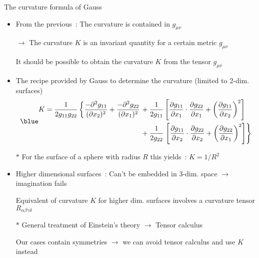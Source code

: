 \Tr
\begin{center}
{\blue The curvature formula of Gauss}
\end{center}
%
\begin{itemize}
\item From the previous~: {\red The curvature is contained in $g_{\mu\nu}$}
\item[] $\rightarrow$ The {\blue curvature $K$} is an invariant quantity for a certain metric $g_{\mu\nu}$
\item[] It should be possible to obtain the curvature $K$ from the tensor $g_{\mu\nu}$
\item The recipe provided by Gauss to determine the curvature (limited to 2-dim. surfaces)
      \begin{equation*}
      {\blue
      \begin{split}
       K=\frac{1}{2g_{11}g_{22}} \left\{
       \frac{-\partial^{2}g_{11}}{(\partial x_{2})^{2}}+\frac{-\partial^{2}g_{22}}{(\partial x_{1})^{2}} \right.
     &+\frac{1}{2g_{11}} \left[
       \frac{\partial g_{11}}{\partial x_{1}} \cdot \frac{\partial g_{22}}{\partial x_{1}}
       +\left(\frac{\partial g_{11}}{\partial x_{2}}\right)^{2} \right] \\
     &+\frac{1}{2g_{22}} \left. \left[
       \frac{\partial g_{11}}{\partial x_{2}} \cdot \frac{\partial g_{22}}{\partial x_{2}}
       +\left(\frac{\partial g_{22}}{\partial x_{1}}\right)^{2} \right] \right\} \\
      \end{split}
      }
      \end{equation*}
\item[$\ast$] For the surface of a sphere with radius $R$ this yields~: $K=1/R^{2}$
\item Higher dimensional surfaces~: Can't be embedded in 3-dim. space $\rightarrow$ imagination fails
\item[] Equivalent of curvature $K$ for higher dim. surfaces involves a
        {\blue curvature tensor $R_{\alpha\beta\gamma\delta}$}
\item[$\ast$] General treatment of Einstein's theory $\rightarrow$ {\blue Tensor calculus}
\item[] Our cases contain symmetries $\rightarrow$ we can avoid tensor calculus and use $K$ instead
\end{itemize}
